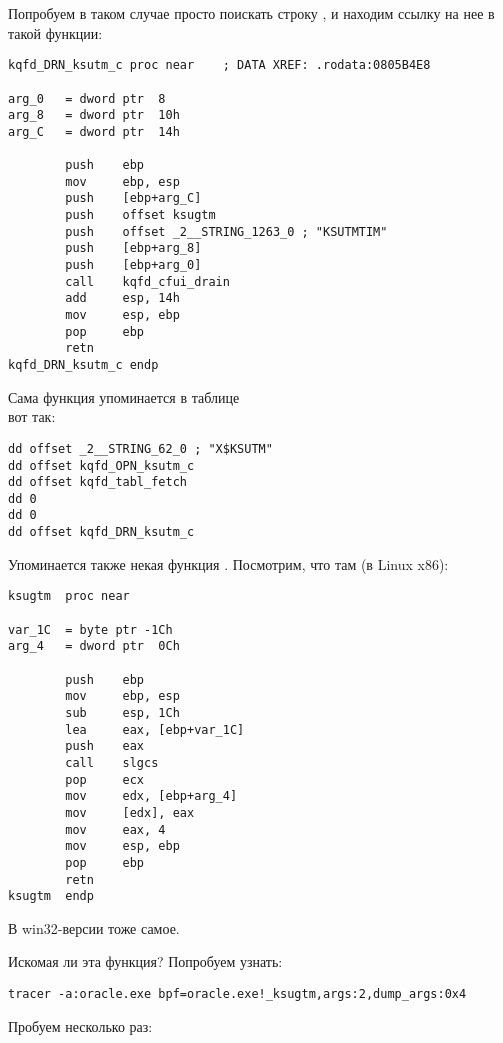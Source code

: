 Попробуем в таком случае просто поискать строку , и находим ссылку на нее в такой функции:

\begin{lstlisting}[style=customasmx86]
kqfd_DRN_ksutm_c proc near    ; DATA XREF: .rodata:0805B4E8

arg_0   = dword ptr  8
arg_8   = dword ptr  10h
arg_C   = dword ptr  14h

        push    ebp
        mov     ebp, esp
        push    [ebp+arg_C]
        push    offset ksugtm
        push    offset _2__STRING_1263_0 ; "KSUTMTIM"
        push    [ebp+arg_8]
        push    [ebp+arg_0]
        call    kqfd_cfui_drain
        add     esp, 14h
        mov     esp, ebp
        pop     ebp
        retn
kqfd_DRN_ksutm_c endp
\end{lstlisting}

Сама функция  упоминается в таблице \\
 вот так:

\begin{lstlisting}[style=customasmx86]
dd offset _2__STRING_62_0 ; "X$KSUTM"
dd offset kqfd_OPN_ksutm_c
dd offset kqfd_tabl_fetch
dd 0
dd 0
dd offset kqfd_DRN_ksutm_c
\end{lstlisting}

Упоминается также некая функция .
Посмотрим, что там (в Linux x86):

\begin{lstlisting}[caption=ksu.o,style=customasmx86]
ksugtm  proc near

var_1C  = byte ptr -1Ch
arg_4   = dword ptr  0Ch

        push    ebp
        mov     ebp, esp
        sub     esp, 1Ch
        lea     eax, [ebp+var_1C]
        push    eax
        call    slgcs
        pop     ecx
        mov     edx, [ebp+arg_4]
        mov     [edx], eax
        mov     eax, 4
        mov     esp, ebp
        pop     ebp
        retn
ksugtm  endp
\end{lstlisting}

В win32-версии тоже самое.

Искомая ли эта функция? Попробуем узнать:

\begin{lstlisting}
tracer -a:oracle.exe bpf=oracle.exe!_ksugtm,args:2,dump_args:0x4
\end{lstlisting}

Пробуем несколько раз:

